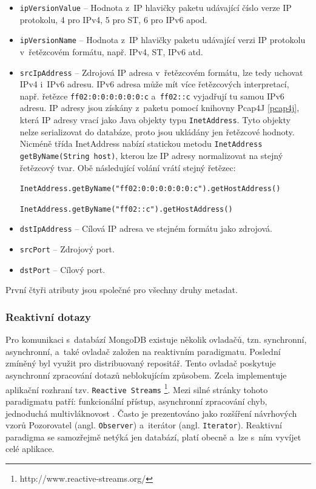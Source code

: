 \begin{itemize}
    \item \texttt{ipVersionValue} -- Hodnota z~IP hlavičky paketu udávající číslo verze IP protokolu, 4 pro IPv4, 5 pro ST, 6 pro IPv6 apod.
    
    \item \texttt{ipVersionName} -- Hodnota z~IP hlavičky paketu udávající verzi IP protokolu v~řetězcovém formátu, např. IPv4, ST, IPv6 atd.
    
    \item \texttt{srcIpAddress} -- Zdrojová IP adresa v~řetězcovém formátu, lze tedy uchovat IPv4 i~IPv6 adresu. IPv6 adresa může mít více řetězcových interpretací, např. řetězce \texttt{ff02:0:0:0:0:0:0:c} a~\texttt{ff02::c} vyjadřují tu samou IPv6 adresu. IP adresy jsou získány z~paketu pomocí knihovny Pcap4J \ref{pcap4j}, která IP adresy vrací jako Java objekty typu \texttt{InetAddress}. Tyto objekty nelze serializovat do databáze, proto jsou ukládány jen řetězcové hodnoty. Nicméně třída InetAddress nabízí statickou metodu \texttt{InetAddress 	getByName(String host)}, kterou lze IP adresy normalizovat na stejný řetězcový tvar. Obě následující volání vrátí stejný řetězec:
    
    \indent \texttt{InetAddress.getByName("ff02:0:0:0:0:0:0:c").getHostAddress()}
    
    \indent \texttt{InetAddress.getByName("ff02::c").getHostAddress()}
    
    \item \texttt{dstIpAddress} -- Cílová IP adresa ve stejném formátu jako zdrojová.
    
    \item \texttt{srcPort} -- Zdrojový port.
    
    \item \texttt{dstPort} -- Cílový port.
\end{itemize}

\noindent První čtyři atributy jsou společné pro všechny druhy metadat.

\subsubsection{Reaktivní dotazy}
Pro komunikaci s~databází MongoDB existuje několik ovladačů, tzn. synchronní, asynchronní, a~také ovladač založen na reaktivním paradigmatu. Poslední zmíněný byl využit pro distribuovaný repositář. Tento ovladač poskytuje asynchronní zpracování dotazů neblokujícím způsobem. Zcela implementuje aplikační rozhraní tzv. \texttt{Reactive Streams} \footnote{http://www.reactive-streams.org/}. Mezi silné stránky tohoto paradigmatu patří: funkcionální přístup, asynchronní zpracování chyb, jednoduchá multivláknovost \cite{oficReactiveX}. Často je prezentováno jako rozšíření návrhových vzorů Pozorovatel (angl. \texttt{Observer}) a~iterátor (angl. \texttt{Iterator}). Reaktivní paradigma se samozřejmě netýká jen databází, platí obecně a~lze s~ním vyvíjet celé aplikace.

